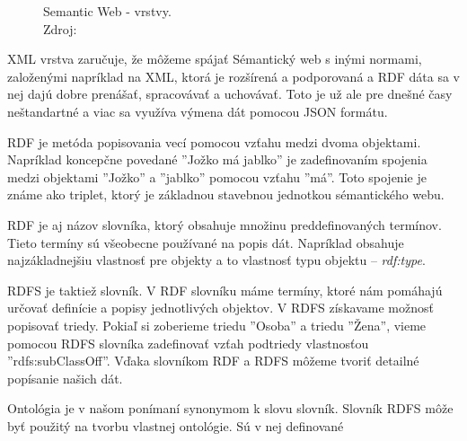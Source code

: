 \documentclass[12pt, a4paper, oneside]{book}
\begin{document}
\begin{figure}
\label{fig:semantic_web}
\caption{Semantic Web - vrstvy.\\Zdroj: \cite{semanticweb}}

\end{figure}

XML vrstva zaručuje, že môžeme spájať Sémantický web s inými normami, založenými napríklad na XML, ktorá je rozšírená a podporovaná a RDF dáta sa v nej dajú dobre prenášať, spracovávať a uchovávať. Toto je už ale pre dnešné časy neštandartné a viac sa využíva výmena dát pomocou JSON formátu. 


RDF je metóda popisovania vecí pomocou vzťahu medzi dvoma objektami. Napríklad koncepčne povedané ''Jožko má jablko'' je zadefinovaním spojenia medzi objektami ''Jožko'' a ''jablko'' pomocou vzťahu ''má''.
Toto spojenie je známe ako triplet, ktorý je základnou stavebnou jednotkou sémantického webu. 


RDF je aj názov slovníka, ktorý obsahuje množinu preddefinovaných termínov. Tieto termíny sú všeobecne používané na popis dát. Napríklad obsahuje najzákladnejšiu vlastnosť pre objekty a to vlastnosť typu objektu -- \textit{rdf:type}. 


RDFS je taktiež slovník. V RDF slovníku máme termíny, ktoré nám pomáhajú určovať definície a popisy jednotlivých objektov. V RDFS získavame možnosť popisovať triedy. Pokiaľ si zoberieme triedu ''Osoba'' a triedu ''Žena'', vieme pomocou RDFS slovníka zadefinovať vzťah podtriedy vlastnosťou ''rdfs:subClassOff''. Vďaka slovníkom RDF a RDFS môžeme tvoriť detailné popísanie našich dát.


Ontológia je v našom ponímaní synonymom k slovu slovník. Slovník RDFS môže byť použitý na tvorbu vlastnej ontológie. Sú v nej definované 
\end{document}
